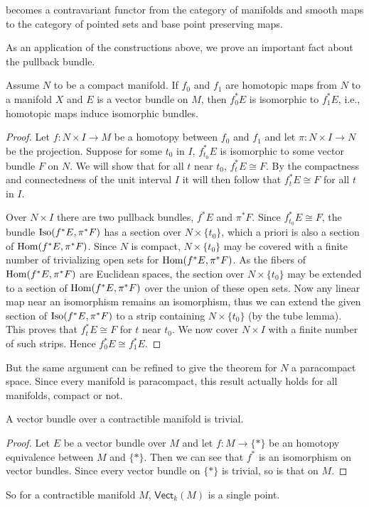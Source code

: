 becomes a contravariant functor from the category of manifolds and smooth maps to the category of pointed sets and base point preserving maps.\par
As an application of the constructions above, we prove an important fact about the pullback bundle.
\begin{proposition}
Assume $N$ to be a compact manifold. If $f_0$ and $f_1$ are homotopic maps from $N$ to a manifold $X$ and $E$ is a vector bundle on $M$, then $f_0^*E$ is isomorphic to 
$f_1^*E$, i.e., homotopic maps induce isomorphic bundles.
\end{proposition}
\begin{proof}
Let $f:N\times I\to M$ be a homotopy between $f_0$ and $f_1$ and let $\pi:N\times I\to N$ be the projection. Suppose for some $t_0$ in $I$, $f_{t_0}^*E$ is isomorphic
to some vector bundle $F$ on $N$. We will show that for all $t$ near $t_0$, $f_{t}^*E\cong F$. By the compactness and connectedness of the unit interval $I$ it will 
then follow that $f_t^*E\cong F$ for all $t$ in $I$.\par
Over $N\times I$ there are two pullback bundles, $f^*E$ and $\pi^*F$. Since $f_{t_0}^*E\cong F$, the bundle $\mathrm{Iso}(f^*E,\pi^*F)$ has a section over $N\times\{t_0\}$, 
which a priori is also a section of $\mathrm{Hom}(f^*E,\pi^*F)$. Since $N$ is compact, $N\times\{t_0\}$ may be covered with a finite number of trivializing open sets for 
$\mathrm{Hom}(f^*E,\pi^*F)$. As the fibers of $\mathrm{Hom}(f^*E,\pi^*F)$ are Euclidean spaces, the section over $N\times\{t_0\}$ may be extended to a section of $\mathrm{Hom}(f^*E,\pi^*F)$ 
over the union of these open sets. Now any linear map near an isomorphism remains an isomorphism, thus we can extend the given section of $\mathrm{Iso}(f^*E,\pi^*F)$ to a 
strip containing $N\times\{t_0\}$ (by the tube lemma). This proves that $f_t^*E\cong F$ for $t$ near $t_0$. We now cover $N\times I$ with a finite number of such 
strips. Hence $f_0^*E\cong f_1^*E$.
\end{proof}
But the same argument can be refined to give the theorem for $N$ a paracompact space. Since every manifold is paracompact, this result actually holds for all manifolds, 
compact or not.
\begin{corollary}
A vector bundle over a contractible manifold is trivial.
\end{corollary}
\begin{proof}
Let $E$ be a vector bundle over $M$ and let $f:M\to\{\ast\}$ be an homotopy equivalence between $M$ and $\{\ast\}$. Then we can see that $f^*$ is an isomorphism on 
vector bundles. Since every vector bundle on $\{\ast\}$ is trivial, so is that on $M$.
\end{proof}
So for a contractible manifold $M$, $\mathsf{Vect}_k(M)$ is a single point.
